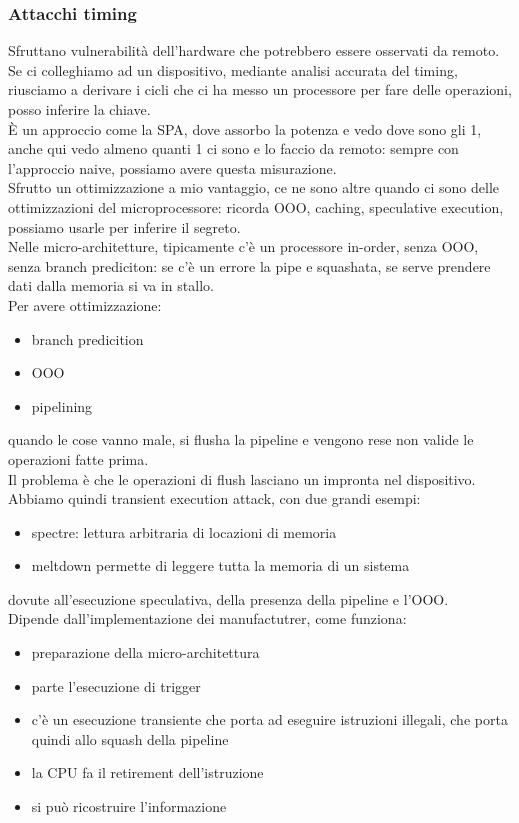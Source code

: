 \documentclass[oneside, 12pt]{extbook}
\begin{document}
\subsubsection{Attacchi timing}
Sfruttano vulnerabilità dell'hardware che potrebbero essere osservati da remoto.
\\Se ci colleghiamo ad un dispositivo, mediante analisi accurata del timing, riusciamo a derivare i cicli che ci ha messo un processore per fare delle operazioni, posso inferire la chiave.
\\È un approccio come la SPA, dove assorbo la potenza e vedo dove sono gli 1, anche qui vedo almeno quanti 1 ci sono e lo faccio da remoto: sempre con l'approccio naive, possiamo avere questa misurazione.
\\Sfrutto un ottimizzazione a mio vantaggio, ce ne sono altre quando ci sono delle ottimizzazioni del microprocessore: ricorda OOO, caching, speculative execution, possiamo usarle per inferire il segreto.
\\Nelle micro-architetture, tipicamente c'è un processore in-order, senza OOO, senza branch prediciton: se c'è un errore la pipe e squashata, se serve prendere dati dalla memoria si va in stallo.
\\Per avere ottimizzazione:
\begin{itemize}
	\item branch predicition
	\item OOO
	\item pipelining
\end{itemize}
quando le cose vanno male, si flusha la pipeline e vengono rese non valide le operazioni fatte prima.
\\Il problema è che le operazioni di flush lasciano un impronta nel dispositivo. Abbiamo quindi transient execution attack, con due grandi esempi:
\begin{itemize}
	\item spectre: lettura arbitraria di locazioni di memoria
	\item meltdown permette di leggere tutta la memoria di un sistema
\end{itemize}
dovute all'esecuzione speculativa, della presenza della pipeline e l'OOO.
\\Dipende dall'implementazione dei manufactutrer, come funziona:
\begin{itemize}
	\item preparazione della micro-architettura
	\item parte l'esecuzione di trigger
	\item c'è un esecuzione transiente che porta ad eseguire istruzioni illegali, che porta quindi allo squash della pipeline
	\item la CPU fa il retirement dell'istruzione
	\item si può ricostruire l'informazione
\end{itemize}
\end{document}
